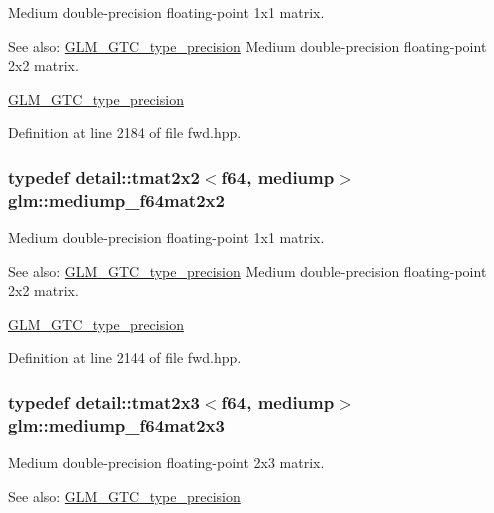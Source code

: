 Medium double-precision floating-point 1x1 matrix. \begin{Desc}
\item[See also:]\hyperlink{group__gtc__type__precision}{GLM\_\-GTC\_\-type\_\-precision} Medium double-precision floating-point 2x2 matrix. 

\hyperlink{group__gtc__type__precision}{GLM\_\-GTC\_\-type\_\-precision} \end{Desc}


Definition at line 2184 of file fwd.hpp.\hypertarget{group__gtc__type__precision_gcfa9f872c78d9e8b8e6c5dd0088db8fc}{
\subsubsection[mediump\_\-f64mat2x2]{\setlength{\rightskip}{0pt plus 5cm}typedef detail::tmat2x2$<$f64, mediump$>$ {\bf glm::mediump\_\-f64mat2x2}}}
\label{group__gtc__type__precision_gcfa9f872c78d9e8b8e6c5dd0088db8fc}


Medium double-precision floating-point 1x1 matrix. \begin{Desc}
\item[See also:]\hyperlink{group__gtc__type__precision}{GLM\_\-GTC\_\-type\_\-precision} Medium double-precision floating-point 2x2 matrix. 

\hyperlink{group__gtc__type__precision}{GLM\_\-GTC\_\-type\_\-precision} \end{Desc}


Definition at line 2144 of file fwd.hpp.\hypertarget{group__gtc__type__precision_g6f463cb5e9b4e5c07a385843ed50e6b8}{
\subsubsection[mediump\_\-f64mat2x3]{\setlength{\rightskip}{0pt plus 5cm}typedef detail::tmat2x3$<$f64, mediump$>$ {\bf glm::mediump\_\-f64mat2x3}}}
\label{group__gtc__type__precision_g6f463cb5e9b4e5c07a385843ed50e6b8}


Medium double-precision floating-point 2x3 matrix. \begin{Desc}
\item[See also:]\hyperlink{group__gtc__type__precision}{GLM\_\-GTC\_\-type\_\-precision} \end{Desc}


